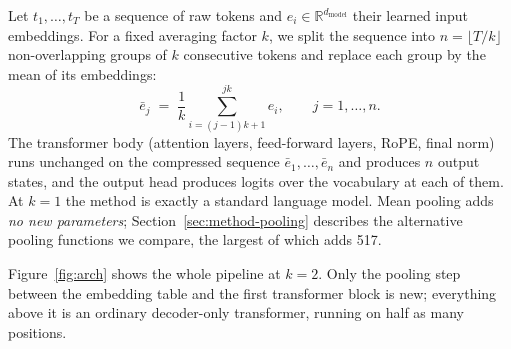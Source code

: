 \documentclass[11pt]{article}
\newcommand{\dmodel}{d_{\mathrm{model}}}
\begin{document}
Let $t_1, \dots, t_T$ be a sequence of raw tokens and $e_i \in
\mathbb{R}^{\dmodel}$ their learned input embeddings. For a fixed averaging
factor $k$, we split the sequence into $n = \lfloor T/k \rfloor$
non-overlapping groups of $k$ consecutive tokens and replace each group by
the mean of its embeddings:
\begin{equation}
\bar{e}_j \;=\; \frac{1}{k} \sum_{i=(j-1)k+1}^{jk} e_i,
\qquad j = 1, \dots, n .
\label{eq:mean-pool}
\end{equation}
The transformer body (attention layers, feed-forward layers, RoPE, final
norm) runs unchanged on the compressed sequence $\bar{e}_1, \dots,
\bar{e}_n$ and produces $n$ output states, and the output head produces
logits over the vocabulary at each of them. At $k{=}1$ the method is exactly
a standard language model. Mean pooling adds \emph{no new parameters};
Section~\ref{sec:method-pooling} describes the alternative pooling functions
we compare, the largest of which adds 517.

Figure~\ref{fig:arch} shows the whole pipeline at $k{=}2$. Only the pooling
step between the embedding table and the first transformer block is new;
everything above it is an ordinary decoder-only transformer, running on half
as many positions.
\end{document}
